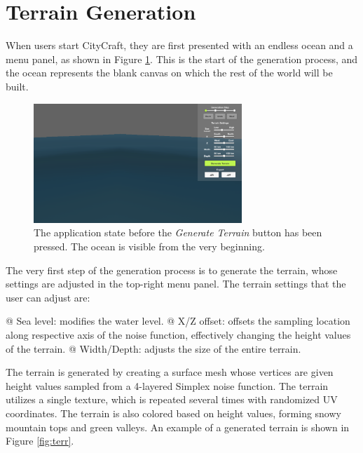 \section{Terrain Generation}

When users start CityCraft, they are first presented with an endless ocean and a menu panel, as shown in Figure \ref{fig:no_terr}.
This is the start of the generation process, and the ocean represents the blank canvas on which the rest of the world will be built.

\begin{figure}[H]
  \centering

  \includegraphics[width=0.7\textwidth]{figure/terrain_not_generated.png}
  \caption{The application state before the \textit{Generate Terrain} button has been pressed. The ocean is visible from the very beginning.}

  \label{fig:no_terr}
\end{figure}

The very first step of the generation process is to generate the terrain, whose settings are adjusted in the top-right menu panel.
The terrain settings that the user can adjust are:
\begin{easylist}
  @ Sea level: modifies the water level.
  @ X/Z offset: offsets the sampling location along respective axis of the noise function, effectively changing the height values of the terrain.
  @ Width/Depth: adjusts the size of the entire terrain.
\end{easylist}

The terrain is generated by creating a surface mesh whose vertices are given height values sampled from a 4-layered Simplex noise function.
The terrain utilizes a single texture, which is repeated several times with randomized UV coordinates.
The terrain is also colored based on height values, forming snowy mountain tops and green valleys.
An example of a generated terrain is shown in Figure \ref{fig:terr}.

